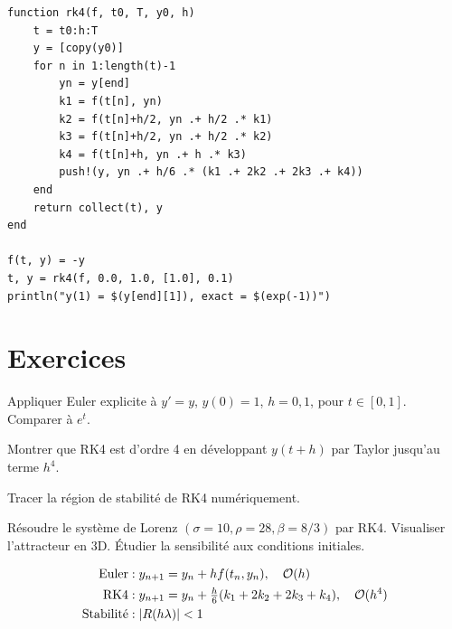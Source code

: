 \begin{codeblock}[title=\textbf{Julia}]
\begin{verbatim}
function rk4(f, t0, T, y0, h)
    t = t0:h:T
    y = [copy(y0)]
    for n in 1:length(t)-1
        yn = y[end]
        k1 = f(t[n], yn)
        k2 = f(t[n]+h/2, yn .+ h/2 .* k1)
        k3 = f(t[n]+h/2, yn .+ h/2 .* k2)
        k4 = f(t[n]+h, yn .+ h .* k3)
        push!(y, yn .+ h/6 .* (k1 .+ 2k2 .+ 2k3 .+ k4))
    end
    return collect(t), y
end

f(t, y) = -y
t, y = rk4(f, 0.0, 1.0, [1.0], 0.1)
println("y(1) = $(y[end][1]), exact = $(exp(-1))")
\end{verbatim}
\end{codeblock}

\section{Exercices}

\begin{exercice}[$\star$]
Appliquer Euler explicite \`a $y'=y$, $y(0)=1$, $h=0{,}1$, pour $t\in[0,1]$. Comparer \`a $e^t$.
\end{exercice}

\begin{exercice}[$\star\star$]
Montrer que RK4 est d'ordre 4 en d\'eveloppant $y(t+h)$ par Taylor jusqu'au terme $h^4$.
\end{exercice}

\begin{exercice}[$\star\star$]
Tracer la r\'egion de stabilit\'e de RK4 num\'eriquement.
\end{exercice}

\begin{exercice}
R\'esoudre le syst\`eme de Lorenz $(\sigma=10,\rho=28,\beta=8/3)$ par RK4. Visualiser l'attracteur en 3D. \'Etudier la sensibilit\'e aux conditions initiales.
\end{exercice}

\begin{formules}
\begin{align*}
\text{Euler} &: y_{n+1}=y_n+hf(t_n,y_n), \quad \mathcal{O}(h) \\
\text{RK4} &: y_{n+1}=y_n+\tfrac{h}{6}(k_1+2k_2+2k_3+k_4), \quad \mathcal{O}(h^4) \\
\text{Stabilit\'e} &: |R(h\lambda)|<1
\end{align*}
\end{formules}
